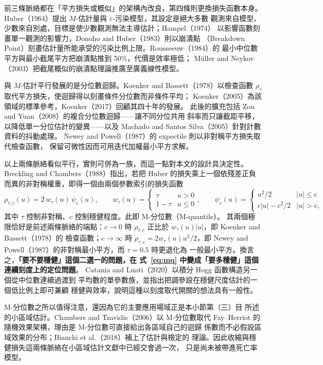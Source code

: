 \documentclass[UTF8, fontset=macnew, a4paper, 12pt]{ctexart}
\begin{document}
前三條脈絡都在「平方損失或概似」的架構內改良，第四條則更換損失函數本身。
Huber（1964）提出 $M$-估計量與 $\varepsilon$-污染模型，其設定是絕大多數
觀測來自模型、少數來自別處，目標是使少數觀測無法主導估計；Hampel（1974）
以影響函數刻畫單一觀測的影響力，Donoho and Huber（1983）則以崩潰點
（Breakdown Point）刻畫估計量所能承受的污染比例上限。Rousseeuw（1984）的
最小中位數平方與最小截尾平方把崩潰點推到 50\%，代價是效率極低；
Müller and Neykov（2003）把截尾概似的崩潰點理論推廣至廣義線性模型。

與 $M$-估計平行發展的是分位數迴歸。Koenker and Bassett（1978）以檢查函數
$\rho_\tau$ 取代平方損失，使迴歸得以刻畫條件分位數而非條件平均；
Koenker（2005）為該領域的標準參考，Koenker（2017）回顧其四十年的發展。
此後的擴充包括 Zou and Yuan（2008）的複合分位數迴歸——讓不同分位共用
斜率而只讓截距平移，以降低單一分位估計的變異——以及
Machado and Santos Silva（2005）針對計數資料的抖動處理。
Newey and Powell（1987）的 expectile 則以非對稱平方損失取代檢查函數，
保留可微性因而可用迭代加權最小平方求解。

以上兩條脈絡看似平行，實則可併為一族，而這一點對本文的設計具決定性。
Breckling and Chambers（1988）指出，若把 Huber 的損失乘上一個依殘差正負
而異的非對稱權重，即得一個由兩個參數索引的損失函數
\begin{equation}\label{eq:mq}
\rho_{\tau,c}(u)=2\,w_\tau(u)\,\psi_c(u),\qquad
w_\tau(u)=\begin{cases}\tau & u>0\\ 1-\tau & u\le 0\end{cases},\qquad
\psi_c(u)=\begin{cases}u^2/2 & |u|\le c\\ c|u|-c^2/2 & |u|>c,\end{cases}
\end{equation}
其中 $\tau$ 控制非對稱、$c$ 控制穩健程度。此即 M-分位數（M-quantile）。
其兩個極限恰好是前述兩條脈絡的端點：$c\to0$ 時
$\rho_{\tau,c}$ 正比於 $w_\tau(u)|u|$，即 Koenker and Bassett（1978）的
檢查函數；$c\to\infty$ 時 $\rho_{\tau,c}=2w_\tau(u)u^2/2$，即
Newey and Powell（1987）的非對稱最小平方，而 $\tau=0.5$ 時更退化為
一般最小平方。換言之，\textbf{「要不要穩健」這個二選一的問題，在
式~\eqref{eq:mq} 中變成「要多穩健」這個連續刻度上的定位問題}。
Catania and Luati（2020）以積分 Hogg 函數構造另一個從中位數連續過渡到
平均數的單參數族，並指出把調參設在穩健尺度估計的一個低比例上即可兼顧
穩健與效率，說明這種以刻度取代開關的想法具有一般性。

M-分位數之所以值得注意，還因為它的主要應用場域正是本小節第（三）目
所述的小區域估計。Chambers and Tzavidis（2006）以 M-分位數取代
Fay--Herriot 的隨機效果架構，理由是 M-分位數可直接給出各區域自己的迴歸
係數而不必假設區域效果的分布；Bianchi et al.（2018）補上了估計與檢定的
理論。因此收縮與穩健損失這兩條脈絡在小區域估計文獻中已經交會過一次，
只是尚未被帶進死亡率模型。
\end{document}

